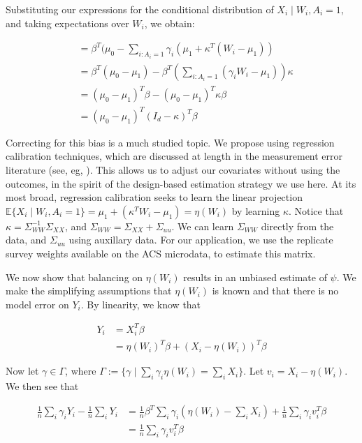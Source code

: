 \documentclass[12pt]{article}
\begin{document}
Substituting our expressions for the conditional distribution of $X_i \mid W_i, A_i = 1$, and taking expectations over $W_i$, we obtain:

\begin{align*}
    &= \beta^T(\mu_0 - \sum_{i: A_i = 1} \gamma_i(\mu_1 + \kappa^T(W_i - \mu_1)) \\
    &= \beta^T(\mu_0 - \mu_1) - \beta^T(\sum_{i: A_i = 1}(\gamma_iW_i - \mu_1))\kappa \\
    &= (\mu_0 - \mu_1)^T\beta - (\mu_0 - \mu_1)^T\kappa\beta \\
    &= (\mu_0 - \mu_1)^T(I_d - \kappa)^T\beta
\end{align*}

Correcting for this bias is a much studied topic. We propose using regression calibration techniques, which are discussed at length in the measurement error literature (see, eg, \cite{carroll2006measurement}). This allows us to adjust our covariates without using the outcomes, in the spirit of the design-based estimation strategy we use here. At its most broad, regression calibration seeks to learn the linear projection $\mathbb{E}\{X_i \mid W_i, A_i = 1\} = \mu_1 + (\kappa^T W_i - \mu_1) = \eta(W_i)$ by learning $\kappa$. Notice that $\kappa = \Sigma_{WW}^{-1}\Sigma_{XX}$, and $\Sigma_{WW} = \Sigma_{XX} + \Sigma_{uu}$. We can learn $\Sigma_{WW}$ directly from the data, and $\Sigma_{uu}$ using auxillary data. For our application, we use the replicate survey weights available on the ACS microdata, to estimate this matrix. 

We now show that balancing on $\eta(W_i)$ results in an unbiased estimate of $\psi$. We make the simplifying assumptions that $\eta(W_i)$ is known and that there is no model error on $Y_i$. By linearity, we know that

\begin{align*}
Y_i &= X_i^T\beta \\
&= \eta(W_i)^T\beta + (X_i - \eta(W_i))^T\beta
\end{align*}

Now let $\gamma \in \Gamma$, where $\Gamma := \{\gamma \mid \sum_i \gamma_i \eta(W_i) = \sum_i X_i\}$. Let $v_i = X_i - \eta(W_i)$. We then see that

\begin{align*}
    \frac{1}{n}\sum_{i}\gamma_{i}Y_{i} - \frac{1}{n}\sum_{i}Y_{i} &= \frac{1}{n}\beta^T\sum_{i}\gamma_{i}(\eta(W_i) - \sum_{i}X_{i}) + \frac{1}{n}\sum_i \gamma_iv_i^T\beta \\
    &= \frac{1}{n}\sum_i \gamma_iv_i^T\beta
\end{align*}
\end{document}
